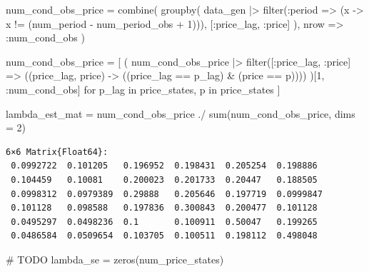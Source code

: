 \documentclass[
  letterpaper,
  DIV=11,
  numbers=noendperiod]{scrreprt}
\newenvironment{Shaded}{\begin{snugshade}}{\end{snugshade}}
\newcommand{\CommentTok}[1]{\textcolor[rgb]{0.37,0.37,0.37}{#1}}
\newcommand{\FloatTok}[1]{\textcolor[rgb]{0.68,0.00,0.00}{#1}}
\newcommand{\FunctionTok}[1]{\textcolor[rgb]{0.28,0.35,0.67}{#1}}
\newcommand{\KeywordTok}[1]{\textcolor[rgb]{0.00,0.23,0.31}{#1}}
\newcommand{\NormalTok}[1]{\textcolor[rgb]{0.00,0.23,0.31}{#1}}
\newcommand{\OperatorTok}[1]{\textcolor[rgb]{0.37,0.37,0.37}{#1}}
\begin{document}
\begin{Shaded}
\begin{Highlighting}[]
\NormalTok{num\_cond\_obs\_price }\OperatorTok{=} \FunctionTok{combine}\NormalTok{(}
    \FunctionTok{groupby}\NormalTok{(}
\NormalTok{        data\_gen }\OperatorTok{|\textgreater{}}
            \FunctionTok{filter}\NormalTok{(}\OperatorTok{:}\NormalTok{period }\OperatorTok{=\textgreater{}}\NormalTok{ (x }\OperatorTok{{-}\textgreater{}}\NormalTok{ x }\OperatorTok{!=}\NormalTok{ (num\_period }\OperatorTok{{-}}\NormalTok{ num\_period\_obs }\OperatorTok{+} \FloatTok{1}\NormalTok{))),}
\NormalTok{        [}\OperatorTok{:}\NormalTok{price\_lag, }\OperatorTok{:}\NormalTok{price]}
\NormalTok{    ),}
\NormalTok{    nrow }\OperatorTok{=\textgreater{}} \OperatorTok{:}\NormalTok{num\_cond\_obs}
\NormalTok{)}

\NormalTok{num\_cond\_obs\_price }\OperatorTok{=}\NormalTok{ [}
\NormalTok{    (}
\NormalTok{        num\_cond\_obs\_price }\OperatorTok{|\textgreater{}} 
            \FunctionTok{filter}\NormalTok{([}\OperatorTok{:}\NormalTok{price\_lag, }\OperatorTok{:}\NormalTok{price] }\OperatorTok{=\textgreater{}}\NormalTok{ ((price\_lag, price) }\OperatorTok{{-}\textgreater{}}\NormalTok{ ((price\_lag }\OperatorTok{==}\NormalTok{ p\_lag) }\OperatorTok{\&}\NormalTok{ (price }\OperatorTok{==}\NormalTok{ p))))}
\NormalTok{    )[}\FloatTok{1}\NormalTok{, }\OperatorTok{:}\NormalTok{num\_cond\_obs]}
\NormalTok{    for p\_lag }\KeywordTok{in}\NormalTok{ price\_states, p }\KeywordTok{in}\NormalTok{ price\_states}
\NormalTok{]}

\NormalTok{lambda\_est\_mat }\OperatorTok{=}\NormalTok{ num\_cond\_obs\_price }\OperatorTok{./} \FunctionTok{sum}\NormalTok{(num\_cond\_obs\_price, dims }\OperatorTok{=} \FloatTok{2}\NormalTok{)}
\end{Highlighting}
\end{Shaded}

\begin{verbatim}
6×6 Matrix{Float64}:
 0.0992722  0.101205   0.196952  0.198431  0.205254  0.198886
 0.104459   0.10081    0.200023  0.201733  0.20447   0.188505
 0.0998312  0.0979389  0.29888   0.205646  0.197719  0.0999847
 0.101128   0.098588   0.197836  0.300843  0.200477  0.101128
 0.0495297  0.0498236  0.1       0.100911  0.50047   0.199265
 0.0486584  0.0509654  0.103705  0.100511  0.198112  0.498048
\end{verbatim}

\begin{Shaded}
\begin{Highlighting}[]
\CommentTok{\# TODO}
\NormalTok{lambda\_se }\OperatorTok{=} \FunctionTok{zeros}\NormalTok{(num\_price\_states)}
\end{Highlighting}
\end{Shaded}
\end{document}
